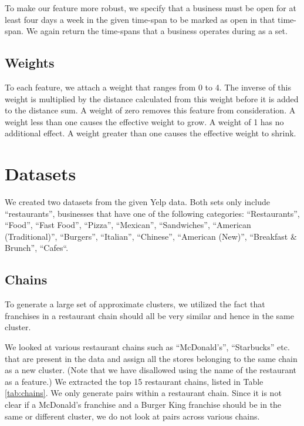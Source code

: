 \documentclass{article}
\begin{document}
\begin{itemize}
\begin{itemize}
            To make our feature more robust, we specify that a business must be open for at least four days a week in the given time-span to be marked as open in that time-span.
            We again return the time-spans that a business operates during as a set.
      
      \end{itemize}
   \end{itemize}

   \subsection{Weights}
      To each feature, we attach a weight that ranges from 0 to 4.
      The inverse of this weight is multiplied by the distance calculated from this weight before it is added to the distance sum.
      A weight of zero removes this feature from consideration.
      A weight less than one causes the effective weight to grow.
      A weight of 1 has no additional effect.
      A weight greater than one causes the effective weight to shrink.

\section{Datasets}
   We created two datasets from the given Yelp data.
   Both sets only include ``restaurants'', businesses that have one of the following categories:
   ``Restaurants'', ``Food'', ``Fast Food'', ``Pizza'', ``Mexican'', ``Sandwiches'', ``American (Traditional)'', ``Burgers'', ``Italian'', ``Chinese'', ``American (New)'', ``Breakfast \& Brunch'', ``Cafes``.

   \subsection{Chains}
      To generate a large set of approximate clusters, we utilized the fact that franchises in a restaurant chain should all be very similar and hence in the same cluster.

      We looked at various restaurant chains such as ``McDonald's'', ``Starbucks'' etc. that are present in the data and assign all the stores belonging to the same chain as a new cluster.
      (Note that we have disallowed using the name of the restaurant as a feature.)
      We extracted the top 15 restaurant chains, listed in Table \ref{tab:chains}.
      We only generate pairs within a restaurant chain.
      Since it is not clear if a McDonald's franchise and a Burger King franchise should be in the same or different cluster, we do not look at pairs across various chains.
\end{document}
